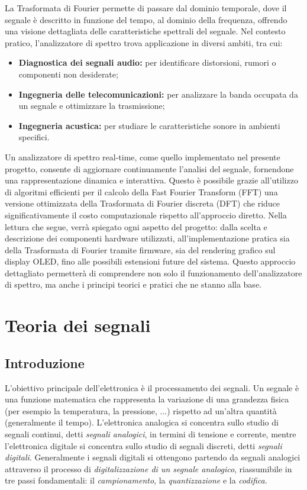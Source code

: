 \documentclass[a4paper,12pt]{report}  %
\begin{document}
La Trasformata di Fourier permette di passare dal dominio temporale, dove il segnale è descritto in funzione del tempo, al dominio della frequenza, offrendo una visione dettagliata delle caratteristiche spettrali del segnale.
Nel contesto pratico, l'analizzatore di spettro trova applicazione in diversi ambiti, tra cui:
\begin{itemize}
    \item \textbf{Diagnostica dei segnali audio:} per identificare distorsioni, rumori o componenti non desiderate;
    \item \textbf{Ingegneria delle telecomunicazioni:} per analizzare la banda occupata da un segnale e ottimizzare la trasmissione;
    \item \textbf{Ingegneria acustica:} per studiare le caratteristiche sonore in ambienti specifici.
\end{itemize}

Un analizzatore di spettro real-time, come quello implementato nel presente progetto, consente di aggiornare continuamente l'analisi del segnale, fornendone una rappresentazione dinamica e interattiva.
Questo è possibile grazie all'utilizzo di algoritmi efficienti per il calcolo della Fast Fourier Transform (FFT) una versione ottimizzata della Trasformata di Fourier discreta (DFT) che riduce significativamente il costo computazionale rispetto all'approccio diretto.
Nella lettura che segue, verrà spiegato ogni aspetto del progetto: dalla scelta e descrizione dei componenti hardware utilizzati, all'implementazione pratica sia della Trasformata di Fourier tramite firmware, sia del rendering grafico sul display OLED, fino alle possibili estensioni future del sistema.
Questo approccio dettagliato permetterà di comprendere non solo il funzionamento dell'analizzatore di spettro, ma anche i principi teorici e pratici che ne stanno alla base.

\section{Teoria dei segnali}

\subsection{Introduzione}
L'obiettivo principale dell'elettronica è il processamento dei segnali.
Un segnale è una funzione matematica che rappresenta la variazione di una grandezza fisica (per esempio la temperatura, la pressione, ...) rispetto ad un'altra quantità (generalmente il tempo).
L'elettronica analogica si concentra sullo studio di segnali continui, detti \textit{segnali analogici}, in termini di tensione e corrente, mentre l'elettronica digitale si concentra sullo studio di segnali discreti, detti \textit{segnali digitali}.
Generalmente i segnali digitali si ottengono partendo da segnali analogici attraverso il processo di \textit{digitalizzazione di un segnale analogico}, riassumibile in tre passi fondamentali: il \textit{campionamento}, la \textit{quantizzazione} e la \textit{codifica}.
\end{document}
